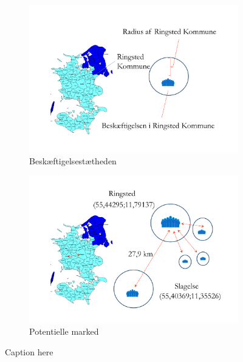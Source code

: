 \documentclass[a4paper, 12pt, titlepage]{article}
\begin{document}
\begin{figure}[h!]
    \centering
    \begin{subfigure}[b]{0.49\textwidth}
        \includegraphics[width=\textwidth]{del1.pdf}
        \caption{Beskæftigelsestætheden}
        \label{fig:del1}
    \end{subfigure}
    \begin{subfigure}[b]{0.49\textwidth}
        \includegraphics[width=\textwidth]{del2.pdf}
        \caption{Potentielle marked}
        \label{fig:del2}
    \end{subfigure}
  \caption{Caption here}
  \label{fig:metode}
\end{figure}
\end{document}
